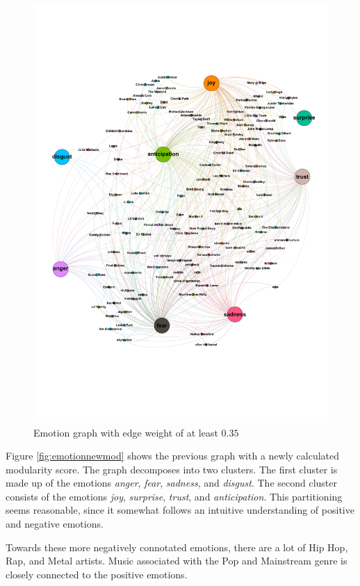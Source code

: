 \documentclass[10pt,a4paper]{article}
\begin{document}
		\begin{figure}[htb]
			\centering
			\includegraphics[trim=0mm 50mm 0mm 50mm, clip, width=\linewidth]{data/emotion_graph}
			\caption{Emotion graph with edge weight of at least $0.35$}
			\label{fig:emotiongraph}
		\end{figure}
		
		Figure \ref{fig:emotionnewmod} shows the previous graph with a newly calculated modularity score. The graph decomposes into two clusters. The first cluster is made up of the emotions \textit{anger}, \textit{fear}, \textit{sadness}, and \textit{disgust}. The second cluster consists of the emotions \textit{joy}, \textit{surprise}, \textit{trust}, and \textit{anticipation}. This partitioning seems reasonable, since it somewhat follows an intuitive understanding of positive and negative emotions.
		
		Towards these more negatively connotated emotions, there are a lot of Hip Hop, Rap, and Metal artists. Music associated with the Pop and Mainstream genre is closely connected to the positive emotions.
		
\end{document}
